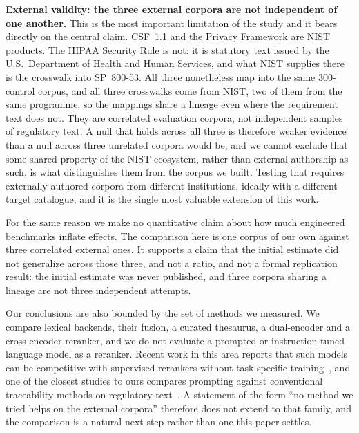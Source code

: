 \documentclass[smallextended,natbib]{svjour3}
\begin{document}
\noindent\textbf{External validity: the three external corpora are not independent of one another.}
This is the most important limitation of the study and it bears directly on the central claim.
CSF~1.1 and the Privacy Framework are NIST products. The HIPAA Security Rule is not: it is statutory text issued by the U.S.\ Department of Health and Human Services, and what NIST supplies there is the crosswalk into SP~800-53. All three nonetheless map into the same 300-control corpus, and all three crosswalks come from NIST, two of them from the same programme, so the mappings share a lineage even where the requirement text does not.
They are correlated evaluation corpora, not independent samples of regulatory text.
A null that holds across all three is therefore weaker evidence than a null across three unrelated corpora would be, and we cannot exclude that some shared property of the NIST ecosystem, rather than external authorship as such, is what distinguishes them from the corpus we built.
Testing that requires externally authored corpora from different institutions, ideally with a different target catalogue, and it is the single most valuable extension of this work.

For the same reason we make no quantitative claim about how much engineered benchmarks inflate effects.
The comparison here is one corpus of our own against three correlated external ones. It supports a claim that the initial estimate did not generalize across those three, and not a ratio, and not a formal replication result: the initial estimate was never published, and three corpora sharing a lineage are not three independent attempts.

Our conclusions are also bounded by the set of methods we measured. We compare lexical backends, their fusion, a curated thesaurus, a dual-encoder and a cross-encoder reranker, and we do not evaluate a prompted or instruction-tuned language model as a reranker. Recent work in this area reports that such models can be competitive with supervised rerankers without task-specific training~\citep{Sun2023}, and one of the closest studies to ours compares prompting against conventional traceability methods on regulatory text~\citep{Etezadi2026}. A statement of the form ``no method we tried helps on the external corpora'' therefore does not extend to that family, and the comparison is a natural next step rather than one this paper settles.
\end{document}
